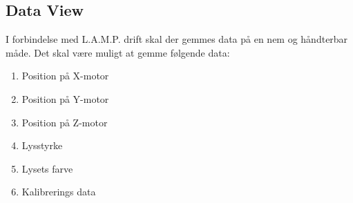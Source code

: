 \subsection{Data View}
I forbindelse med L.A.M.P. drift skal der gemmes data på en nem og håndterbar måde. Det skal være muligt at gemme følgende data:
\begin{enumerate}
    \item Position på X-motor
    \item Position på Y-motor
    \item Position på Z-motor
    \item Lysstyrke
    \item Lysets farve
    \item Kalibrerings data
\end{enumerate}